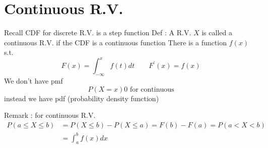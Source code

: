     \section*{Continuous R.V.}
    Recall CDF for discrete R.V. is a step function
    Def : A R.V. $X$ is called a continuous R.V. if the CDF is a continuous function There is a function $f(x)$ s.t.
    \[
	F(x) = \int_{-\infty}^{x} f(t) dt \qquad F^{\prime} (x) = f(x)
    \] 
    We don't have pmf
    \[
	P(X = x) 0 \text{ for continuous}
    \] 
    instead we have pdf (probability density function)

    Remark : for continuous R.V. 
    \begin{align*}
	P(a \le X \le b) &= P(X \le b) - P(X \le a) = F(b) - F(a) = P(a < X < b) \\
			 &= \int_{a}^{b} f(x) dx
    \end{align*}


